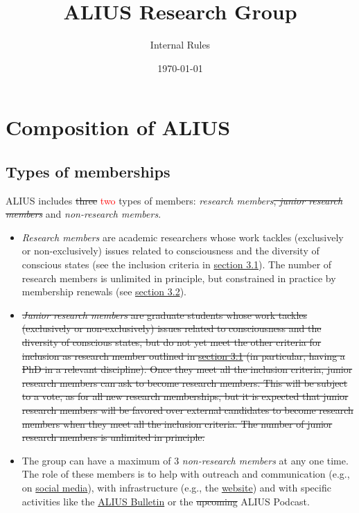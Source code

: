 \documentclass[a4paper, 11pt]{scrartcl}
\begin{document}
\title{\vspace{-2cm} \LARGE ALIUS Research Group}
\subtitle{\Large Internal Rules}
\author{}
\date{\large \today}
\maketitle

\section{Composition of ALIUS}
\subsection{Types of memberships}

ALIUS includes \sout{three} \textcolor{red}{two} types of members: \emph{research members}\sout{, \emph{junior research members}} and \emph{non-research members}.

\begin{itemize}

\item \emph{Research members} are academic researchers whose work tackles (exclusively or non-exclusively) issues related to consciousness and the diversity of conscious states (see the inclusion criteria in \hyperref[new_memberships]{section 3.1}). The number of research members is unlimited in principle, but constrained in practice by membership renewals (see \hyperref[membership_renewal]{section 3.2}). 

\item \sout{\emph{Junior research members} are graduate students whose work tackles (exclusively or non-exclusively) issues related to consciousness and the diversity of conscious states, but do not yet meet the other criteria for inclusion as research member outlined in \hyperref[new_memberships]{section 3.1} (in particular, having a PhD in a relevant discipline). Once they meet all the inclusion criteria, junior research members can ask to become research members. This will be subject to a vote, as for all new research memberships, but it is expected that junior research members will be favored over external candidates to become research members when they meet all the inclusion criteria. The number of junior research members is unlimited in principle.} 

\item The group can have a maximum of 3 \emph{non-research members} at any one time. The role of these members is to help with outreach and communication (e.g., on \href{https://www.facebook.com/aliusresearch/}{social media}), with infrastructure (e.g., the \href{https://www.aliusresearch.org/}{website}) and with specific activities like the \href{https://www.aliusresearch.org/bulletin.html}{ALIUS Bulletin} or the \sout{upcoming }ALIUS Podcast.


\end{itemize}
\end{document}
